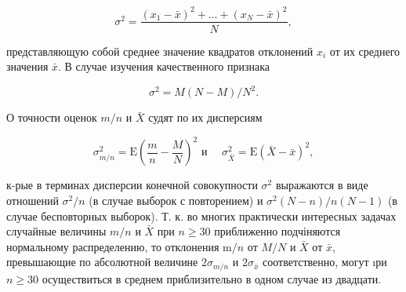 \documentclass[10pt]{article}
\begin{document}
\[

\sigma^{2}=\frac{\left(x_{1}-\bar{x}\right)^{2}+\ldots+\left(x_{N}-\bar{x}\right)^{2}}{N},

\]



представляющую собой среднее значение квадратов отклонений $x_{i}$ от их среднего значения $\bar{x}$. В случае изучения качественного признака



\[

\sigma^{2}=M(N-M) / N^{2} .

\]



О точности оценок $m / n$ и $\bar{X}$ судят по их дисперсиям



\[

\sigma_{m / n}^{2}=\mathrm{E}\left(\frac{m}{n}-\frac{M}{N}\right)^{2} \text { и } \quad \sigma_{\bar{X}}^{2}=\mathrm{E}(\bar{X}-\bar{x})^{2},

\]



к-рые в терминах дисперсии конечной совокупности $\sigma^{2}$ выражаются в виде отношений $\sigma^{2} / n$ (в случае выборок с повторением) и $\sigma^{2}(N-n) / n(N-1)$ (в случае бесповторных выборок). Т. к. во многих практически интересных задачах случайные величины $m / n$ и $\bar{X}$ при $n \geqslant 30$ приближенно подчіняются нормальному распределению, то отклонения $\mathrm{m} / n$ от $M / N$ и $\bar{X}$ от $\bar{x}$, превышающие по абсолютной величине $2 \sigma_{m / n}$ и $2 \sigma_{\bar{x}}$ соответственно, могут ıри $n \geqslant 30$ осуществиться в среднем приблизительно в одном случае из двадцати.
\end{document}
